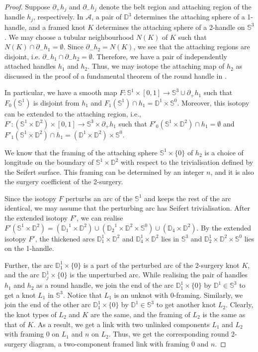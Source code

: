 \documentclass{amsart}
\theoremstyle{plain}
\theoremstyle{remark}
\theoremstyle{definition}
\newcommand{\s}{\mathbb{S}}
\newcommand{\D}{\mathbb{D}}
\newcommand{\dd}{\partial}
\begin{document}
\begin{proof}
Suppose $\dd_{+} h_{j}$ and $\dd_{-}h_j$ denote the belt region and attaching region of the handle $h_j$, respectively. 
In $\mathcal{A}$, a pair of $\D^3$ determines the attaching sphere of a 1-handle, and a framed knot $K$ determines the attaching sphere of a 2-handle on $\s^3$.
We may choose a tubular neighbourhood $N(K)$ of $K$ such that $N(K)\cap \partial_{-}h_1 = \emptyset$. 
Since $\partial_{-}h_2= N(K)$, we see that the attaching regions are disjoint, i.e. $\dd_{-}h_1\cap \dd_{-}h_2= \emptyset$. 
Therefore, we have a pair of independently attached handles $h_1$ and $h_2$. 
Thus, we may isotope the attaching map of $h_2$ as discussed in the proof of a fundamental theorem of the round handle in \cite{Asimov}. 

In particular, we have a smooth map $F: \s^1 \times [0,1] \to \s^3 \cup \partial_+ h_1$ such that $F_0(\s^1)$ is disjoint from $h_1$ and $F_1(\s^1) \cap h_1 = \D^1 \times \s^0$. 
Moreover, this isotopy can be extended to the attaching region, i.e.,  $F' : (\s^1\times \D^2)\times [0,1]\to \s^3 \times \partial_+h_1$ such that $F'_0(\s^1\times \D^2) \cap h_1 = \emptyset $ and $F'_1 (\s^1 \times \D^2)\cap h_1 = (\D^1 \times \D^2) \times \s^0$. 

We know that the framing of the attaching sphere $\s^1 \times \{0\} $ of $h_2$ is a choice of longitude on the boundary of $\s^1 \times \D^2$ with respect to the trivialisation defined by the Seifert surface. 
This framing can be determined by an integer $n$, and it is also the surgery coefficient of the 2-surgery.  

Since the isotopy $F$ perturbs an arc of the $\s^1$ and keeps the rest of the arc identical, we may assume that the perturbing arc has Seifert trivialisation. 
After the extended isotopy $F'$, we can realise $F'(\s^1\times \D^2)= ({\D_1}^1\times \D^2) \cup ({\D_2}^1\times \D^2 \times \s^0) \cup ({\D_4}\times \D^2)$. 
By the extended isotopy $F'$, the thickened arcs $\D_1^1 \times \D^2 $ and $\D_4^1 \times \D^2$ lies in $\s^3$ and $\D^{1}_2\times \D^2 \times \s^0 $ lies on the 1-handle. 

Further, the arc $\D_1^1 \times \{0\} $ is a part of the perturbed arc of the 2-surgery knot $K$, and the arc $\D_j^1 \times \{0\} $ is the unperturbed arc. 
While realising the pair of handles $h_1$ and $h_2$ as a round handle, we join the end of the arc $\D_1^1 \times \{0\} $ by $\D^1 \in \s^3$ to get a knot $L_1$ in $\s^3$. Notice that $L_1$ is an unknot with 0-framing. 
Similarly, we join the end of the other arc $\D_1^1 \times \{0\}$ by $\D^1 \in \s^3$ to get another knot $L_2$. Clearly, the knot types of $L_2$ and $K$ are the same, and the framing of $L_{2}$ is the same as that of $K$.  
As a result, we get a link with two unlinked components $L_{1}$ and $L_{2}$ with framing $0$ on $ L_{1} $ and $n$ on $L_{2}$.
Thus, we get the corresponding round 2-surgery diagram, a two-component framed link with framing $0$ and $n$. 
\end{proof}
\end{document}

